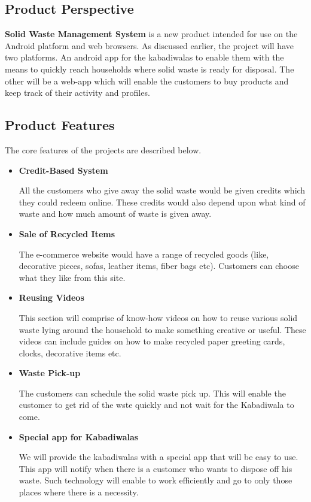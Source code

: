 \documentclass{article}
\begin{document}
\subsection{Product Perspective}
\par \textbf{Solid Waste Management System} is a new product intended for use on the Android platform and web browsers. As discussed earlier, the project will have two platforms. An android app for the kabadiwalas to enable them with the means to quickly reach households where solid waste is ready for disposal. The other will be a web-app which will enable the customers to buy products and keep track of their activity and profiles.
\subsection{Product Features}
\par The core features of the projects are described below. 
\begin{itemize}
    \item \textbf{Credit-Based System}
    \par All the customers who give away the solid waste would be given credits which they could redeem online.
    These credits would also depend upon what kind of waste and how much amount of waste is given away.
    
    \item \textbf{Sale of Recycled Items}
    \par The e-commerce website would have a range of recycled goods (like, decorative pieces, sofas, leather items, fiber bags etc). Customers can choose what they like from this site.
    
    \item \textbf{Reusing Videos}
    \par This section will comprise of know-how videos on how to reuse various solid waste lying around the household to make something creative or useful. These videos can include guides on how to make recycled paper greeting cards, clocks, decorative items etc. 
    
    \item \textbf{Waste Pick-up}
    \par The customers can schedule the solid waste pick up. This will enable the customer to get rid of the wste quickly and not wait for the Kabadiwala to come. 
    
    \item \textbf{Special app for Kabadiwalas}
    \par We will provide the kabadiwalas with a special app that will be easy to use. This app will notify when there is a customer who wants to dispose off his waste. Such technology will enable to work efficiently and go to only those places where there is a necessity.
    
    
\end{itemize}
\end{document}
